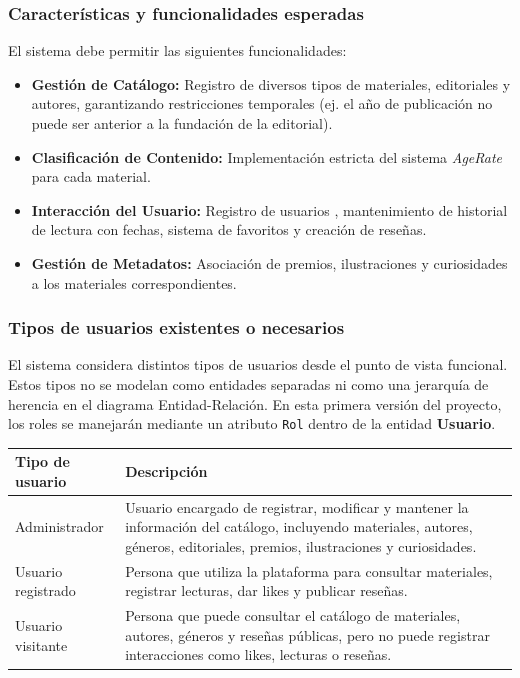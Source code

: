 \documentclass[12pt,a4paper]{article}
\begin{document}
\subsubsection{Características y funcionalidades esperadas}
El sistema debe permitir las siguientes funcionalidades:
\begin{itemize}
    \item \textbf{Gestión de Catálogo:} Registro de diversos tipos de materiales, editoriales y autores, garantizando restricciones temporales (ej. el año de publicación no puede ser anterior a la fundación de la editorial).
    \item \textbf{Clasificación de Contenido:} Implementación estricta del sistema \textit{AgeRate} para cada material.
    \item \textbf{Interacción del Usuario:} Registro de usuarios , mantenimiento de historial de lectura con fechas, sistema de favoritos y creación de reseñas.
    \item \textbf{Gestión de Metadatos:} Asociación de premios, ilustraciones y curiosidades a los materiales correspondientes.
\end{itemize}


\subsubsection{Tipos de usuarios existentes o necesarios}

El sistema considera distintos tipos de usuarios desde el punto de vista funcional. Estos tipos no se modelan como entidades separadas ni como una jerarquía de herencia en el diagrama Entidad-Relación. En esta primera versión del proyecto, los roles se manejarán mediante un atributo \texttt{Rol} dentro de la entidad \textbf{Usuario}.

\begin{longtable}{p{4cm} p{10cm}}
\toprule
\textbf{Tipo de usuario} & \textbf{Descripción} \\
\midrule
\endhead

Administrador & Usuario encargado de registrar, modificar y mantener la información del catálogo, incluyendo materiales, autores, géneros, editoriales, premios, ilustraciones y curiosidades. \\

Usuario registrado & Persona que utiliza la plataforma para consultar materiales, registrar lecturas, dar likes y publicar reseñas. \\

Usuario visitante & Persona que puede consultar el catálogo de materiales, autores, géneros y reseñas públicas, pero no puede registrar interacciones como likes, lecturas o reseñas. \\

\bottomrule
\end{longtable}
\end{document}
